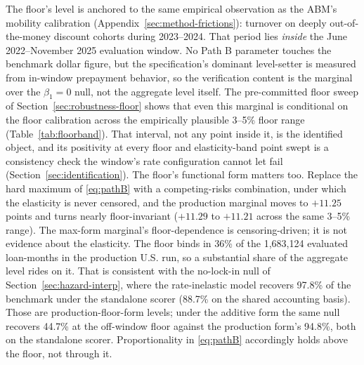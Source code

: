 The floor's level is anchored to the same empirical observation as the ABM's mobility calibration (Appendix~\ref{sec:method-frictions}): turnover on deeply out-of-the-money discount cohorts during 2023--2024. That period lies \emph{inside} the June 2022--November 2025 evaluation window. No Path B parameter touches the benchmark dollar figure, but the specification's dominant level-setter is measured from in-window prepayment behavior, so the verification content is the marginal over the $\beta_1 = 0$ null, not the aggregate level itself. The pre-committed floor sweep of Section~\ref{sec:robustness-floor} shows that even this marginal is conditional on the floor calibration across the empirically plausible 3--5\% floor range (Table~\ref{tab:floorband}). That interval, not any point inside it, is the identified object, and its positivity at every floor and elasticity-band point swept is a consistency check the window's rate configuration cannot let fail (Section~\ref{sec:identification}). The floor's functional form matters too. Replace the hard maximum of \eqref{eq:pathB} with a competing-risks combination, under which the elasticity is never censored, and the production marginal moves to $+11.25$ points and turns nearly floor-invariant ($+11.29$ to $+11.21$ across the same 3--5\% range). The max-form marginal's floor-dependence is censoring-driven; it is not evidence about the elasticity. The floor binds in 36\% of the 1,683,124 evaluated loan-months in the production U.S. run, so a substantial share of the aggregate level rides on it. That is consistent with the no-lock-in null of Section~\ref{sec:hazard-interp}, where the rate-inelastic model recovers 97.8\% of the benchmark under the standalone scorer (88.7\% on the shared accounting basis). Those are production-floor-form levels; under the additive form the same null recovers 44.7\% at the off-window floor against the production form's 94.8\%, both on the standalone scorer. Proportionality in \eqref{eq:pathB} accordingly holds above the floor, not through it.

